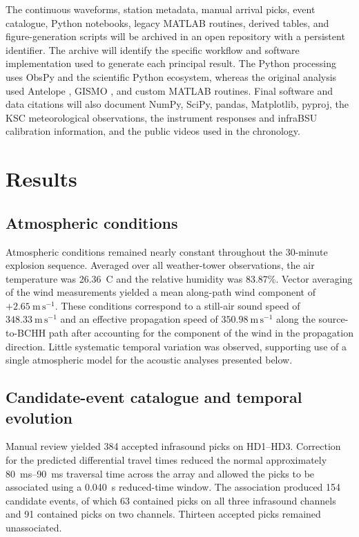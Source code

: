 \documentclass[]{seismica}
\begin{document}
The continuous waveforms, station metadata, manual arrival picks, event catalogue, Python notebooks, legacy MATLAB routines, derived tables, and figure-generation scripts will be archived in an open repository with a persistent identifier. The archive will identify the specific workflow and software implementation used to generate each principal result. The Python processing uses ObsPy \citep{beyreuther_obspy_2010,krischer_obspy_2015}
and the scientific Python ecosystem, whereas the original analysis used
Antelope \citep{brtt_antelope}, GISMO \citep{thompson_gismo_2017}, and custom
MATLAB routines. Final software and data citations will also document NumPy,
SciPy, pandas, Matplotlib, pyproj, the KSC meteorological observations, the
instrument responses and infraBSU calibration information, and the public
videos used in the chronology.

\section{Results}
\label{sec:results}

\subsection{Atmospheric conditions}
\label{sec:results_atmosphere}

Atmospheric conditions remained nearly constant throughout the 30-minute explosion sequence. Averaged over all weather-tower observations, the air temperature was 26.36~\textdegree C and the relative humidity was 83.87\%. Vector averaging of the wind measurements yielded a mean along-path wind component of $+2.65~\mathrm{m\,s^{-1}}$. These conditions correspond to a still-air sound speed of $348.33~\mathrm{m\,s^{-1}}$ and an effective propagation speed of $350.98~\mathrm{m\,s^{-1}}$ along the source-to-BCHH path after accounting for the component of the wind in the propagation direction. Little systematic temporal variation was observed, supporting use of a single atmospheric model for the acoustic analyses presented below.


\subsection{Candidate-event catalogue and temporal evolution}
\label{sec:results_catalogue}

Manual review yielded 384 accepted infrasound picks on HD1--HD3. Correction for
the predicted differential travel times reduced the normal approximately
\SIrange{80}{90}{\milli\second} traversal time across the array and allowed the
picks to be associated using a \SI{0.040}{\second} reduced-time window. The
association produced 154 candidate events, of which 63 contained picks on all
three infrasound channels and 91 contained picks on two channels. Thirteen
accepted picks remained unassociated.
\end{document}
